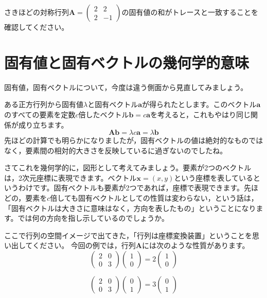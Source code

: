\documentclass{ltjsbook}
\begin{document}
\begin{reidai}{}{}
	さきほどの対称行列$\bm{A} = \begin{pmatrix}2 & 2 \\ 2 & -1 \end{pmatrix}$の固有値の和がトレースと一致することを確認してください。
\end{reidai}

\section{固有値と固有ベクトルの幾何学的意味}

固有値，固有ベクトルについて，今度は違う側面から見直してみましょう。

ある正方行列から固有値$\lambda$と固有ベクトル$\bm{a}$が得られたとします。このベクトル$\bm{a}$のすべての要素を定数$c$倍したベクトル$\bm{b}=c\bm{a}$を考えると，これもやはり同じ関係が成り立ちます。
\begin{equation}
	\bm{A}\bm{b}=  \lambda c \bm{a} =\lambda \bm{b}
\end{equation}
先ほどの計算でも明らかになりましたが，固有ベクトルの値は絶対的なものではなく，要素間の相対的大きさを反映しているに過ぎないのでしたね。

さてこれを幾何学的に，図形として考えてみましょう。要素が2つのベクトルは，2次元座標に表現できます。ベクトル$\bm{x}=(x,y)$という座標を表しているというわけです。固有ベクトルも要素が2つであれば，座標で表現できます。先ほどの，要素を$c$倍しても固有ベクトルとしての性質は変わらない，という話は，「固有ベクトルは大きさに意味はなく，方向を表したもの」ということになります。では何の方向を指し示しているのでしょうか。

ここで行列の空間イメージで出てきた，「行列は座標変換装置」ということを思い出してください。
今回の例では，行列$\bm{A}$には次のような性質があります。
\begin{equation}
	\begin{pmatrix}
		2 & 0 \\
		0 & 3
	\end{pmatrix}
	\begin{pmatrix}
		1 \\
		0
	\end{pmatrix}
	= 2 \begin{pmatrix} 1 \\ 0 \end{pmatrix}
\end{equation}

\begin{equation}
	\begin{pmatrix} 2 & 0\\ 0 & 3 \end{pmatrix} \begin{pmatrix} 0 \\ 1 \end{pmatrix}
	= 3 \begin{pmatrix} 0 \\ 1 \end{pmatrix}
\end{equation}
\end{document}
